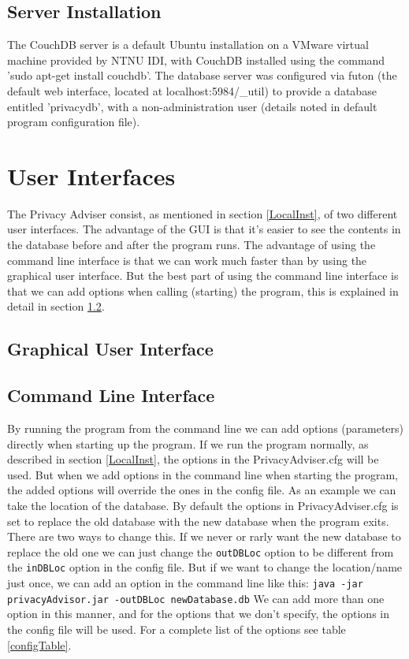 \subsection{Server Installation}
The CouchDB server is a default Ubuntu installation on a VMware virtual machine provided by NTNU IDI, with CouchDB installed using the command 'sudo apt-get install couchdb'. The database server was configured via futon (the default web interface, located at localhost:5984/_util) to provide a database entitled 'privacydb', with a non-administration user (details noted in default program configuration file).

\section{User Interfaces}
The Privacy Adviser consist, as mentioned in section \ref{LocalInst}, of two different user interfaces. The advantage of the GUI is that it's easier to see the contents in the database before and after the program runs. The advantage of using the command line interface is that we can work much faster than by using the graphical user interface. But the best part of using the command line interface is that we can add options when calling (starting) the program, this is explained in detail in section \ref{cliExplained}.

\subsection{Graphical User Interface}

\subsection{Command Line Interface} \label{cliExplained}
By running the program from the command line we can add options (parameters) directly when starting up the program. If we run the program normally, as described in section \ref{LocalInst}, the options in the PrivacyAdviser.cfg will be used. But when we add options in the command line when starting the program, the added options will override the ones in the config file.
As an example we can take the location of the database. By default the options in PrivacyAdviser.cfg is set to replace the old database with the new database when the program exits. There are two ways to change this. If we never or rarly want the new database to replace the old one we can just change the \texttt{outDBLoc} option to be different from the \texttt{inDBLoc} option in the config file. But if we want to change the location/name just once, we can add an option in the command line like this:
\texttt{java -jar privacyAdvisor.jar -outDBLoc newDatabase.db}
We can add more than one option in this manner, and for the options that we don't specify, the options in the config file will be used. For a complete list of the options see table \ref{configTable}.

